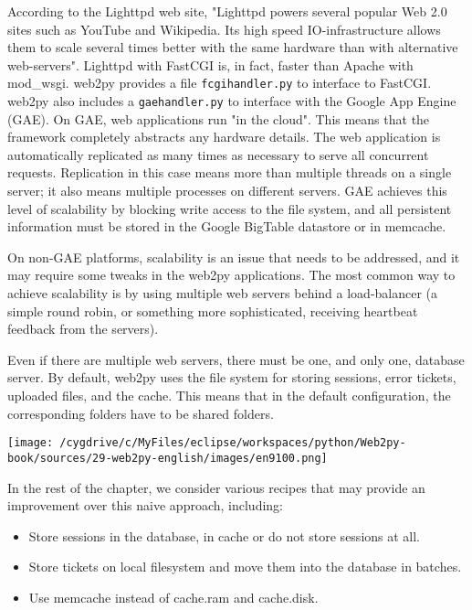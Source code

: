 \documentclass[justified,sixbynine,notoc]{tufte-book}
\def\ft{\small\tt}
\begin{document}
\begin{fullwidth}
According to the Lighttpd web site, "Lighttpd powers several popular Web 2.0 sites such as YouTube and Wikipedia. Its high speed IO-infrastructure allows them to scale several times better with the same hardware than with alternative web-servers". Lighttpd with FastCGI is, in fact, faster than Apache with mod\_wsgi.
\noindent web2py provides a file {\ft fcgihandler.py} to interface to FastCGI.
\noindent web2py also includes a {\ft gaehandler.py} to interface with the
Google App Engine (GAE). On GAE, web applications run "in the cloud". This means that the framework completely abstracts any hardware details. The web application is automatically replicated as many times as necessary to serve all concurrent requests. Replication in this case means more than multiple threads on a single server; it also means multiple processes on different servers. GAE achieves this level of scalability by blocking write access to the file system, and all persistent information must be stored in the Google BigTable datastore or in memcache.

On non-GAE platforms, scalability is an issue that needs to be addressed, and it may require some tweaks in the web2py applications. The most common way to achieve scalability is by using multiple web servers behind a load-balancer (a simple round robin, or something more sophisticated, receiving heartbeat feedback from the servers).

Even if there are multiple web servers, there must be one, and only one, database server. By default, web2py uses the file system for storing sessions, error tickets, uploaded files, and the cache. This means that in the default configuration, the corresponding folders have to be shared folders.


\goodbreak\begin{center}\texttt{[image: /cygdrive/c/MyFiles/eclipse/workspaces/python/Web2py-book/sources/29-web2py-english/images/en9100.png]}\end{center}


In the rest of the chapter, we consider various recipes that may provide an improvement over this naive approach, including:
\begin{itemize}
\item Store sessions in the database, in cache or do not store sessions at all.

\item Store tickets on local filesystem and move them into the database in batches.

\item Use memcache instead of cache.ram and cache.disk.


\end{itemize}
\end{fullwidth}
\end{document}
